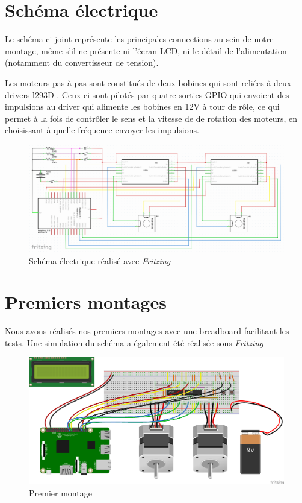 \documentclass[12pt,a4paper]{report}
\begin{document}
\section{Schéma électrique}
Le schéma ci-joint représente les principales connections au sein de notre montage, même s'il ne présente ni l'écran LCD, ni le détail de l'alimentation (notamment du convertisseur de tension).

Les moteurs pas-à-pas sont constitués de deux bobines qui sont reliées à deux drivers l293D . Ceux-ci sont pilotés par quatre sorties GPIO qui envoient des impulsions au driver qui alimente les bobines en 12V à tour de rôle, ce qui permet à la fois de contrôler le sens et la vitesse de de rotation des moteurs, en choisissant à quelle fréquence envoyer les impulsions.
\begin{figure}[!h]
 \center
 \includegraphics[scale=0.34]{../pictures/Sudoku_schema_electrique.png}
 \caption{Schéma électrique réalisé avec \emph{Fritzing}}
\end{figure}

\section{Premiers montages}
Nous avons réalisés nos premiers montages avec une breadboard facilitant les tests. Une simulation du schéma a également été réalisée sous \emph{Fritzing}
\begin{figure}[!h]
 \center
 \includegraphics[scale=0.45]{../pictures/Sudoku_schema}
 \caption{Premier montage}
\end{figure}
\end{document}
